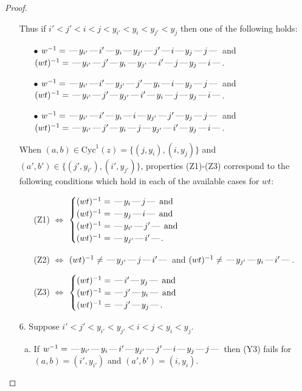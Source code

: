 \documentclass[10pt]{article}
\theoremstyle{definition}
\theoremstyle{definition}
\def\dash{\text{\hspace{0.5mm}---\hspace{0.5mm}}}
\def\Cyc{\mathrm{Cyc}}
\begin{document}
\begin{proof}
\begin{enumerate}
Thus if $i' < j' < i < j < y_{i'} < y_i < y_{j'} < y_j$ then one of the following holds:
\begin{enumerate}
\item[$\bullet$] $w^{-1} = \dash y_{i'}\dash i'\dash y_i\dash y_{j'}\dash j'\dash i\dash y_j\dash j\dash $ and $(wt)^{-1} = \dash y_{i'}\dash j'\dash y_i\dash y_{j'}\dash i'\dash j\dash y_j\dash i\dash $.
\item[$\bullet$] $w^{-1} = \dash y_{i'}\dash i'\dash y_{j'}\dash j'\dash y_i\dash i\dash y_j\dash j\dash $ and $(wt)^{-1} = \dash y_{i'}\dash j'\dash y_{j'}\dash i'\dash y_i\dash j\dash y_j\dash i\dash $.
\item[$\bullet$] $w^{-1} = \dash y_{i'}\dash i'\dash y_i\dash i\dash y_{j'}\dash j'\dash y_j\dash j\dash $ and $(wt)^{-1} = \dash y_{i'}\dash j'\dash y_i\dash j\dash y_{j'}\dash i'\dash y_j\dash i\dash $.
\end{enumerate}
When $(a,b)\in\Cyc^1(z)=\{(j,y_i),(i,y_j)\}$ and $(a',b')\in\{(j',y_{i'}),(i',y_{j'})\}$,
properties (Z1)-(Z3) correspond to the following conditions which
hold in each of the available cases for $wt$:
\begin{enumerate}
\item[](Z1) $\Leftrightarrow$ $\begin{cases}\text{$(wt)^{-1} = \dash y_i \dash j \dash$}\text{ and }\\
\text{$(wt)^{-1} = \dash y_j \dash i \dash$}\text{ and }\\
\text{$(wt)^{-1} = \dash y_{i'} \dash j' \dash$}\text{ and }\\
\text{$(wt)^{-1} = \dash y_{j'} \dash i' \dash$}.\end{cases}$
\item[](Z2) $\Leftrightarrow$ $(wt)^{-1} \neq \dash y_{j'} \dash j \dash i' \dash$ and $(wt)^{-1}\neq \dash y_{j'} \dash y_i \dash i' \dash$.
\item[](Z3) $\Leftrightarrow$ $\begin{cases}\text{$(wt)^{-1} = \dash i' \dash y_j \dash$}\text{ and }\\
\text{$(wt)^{-1} = \dash j' \dash y_i \dash$}\text{ and }\\
\text{$(wt)^{-1} = \dash j' \dash y_j \dash$}.\end{cases}$
\end{enumerate}
\item[$6$.] Suppose $i' < j' < y_{i'} < y_{j'} < i < j < y_i < y_j$.
\begin{enumerate}[(a)]
\item If $w^{-1} = \dash y_{i'}\dash y_i\dash i'\dash y_{j'}\dash j'\dash i\dash y_j\dash j\dash $ then (Y3) fails for $(a,b)=(i',y_{i'})$ and $(a',b')=(i,y_i)$.

\end{enumerate}
\end{enumerate}
\end{proof}
\end{document}
